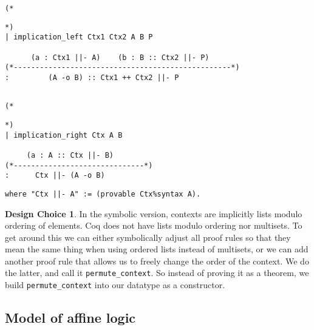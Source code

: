 \documentclass{article}
\theoremstyle{definition}
\newtheorem*{designchoice}{Design Choice}
\begin{document}
\noindent\begin{minipage}{\textwidth}
\begin{verbatim}
(*
\end{verbatim}
\begin{center}\usebox{\lolliL}\end{center}
\begin{verbatim}
*)
| implication_left Ctx1 Ctx2 A B P

      (a : Ctx1 ||- A)    (b : B :: Ctx2 ||- P)
(*--------------------------------------------------*)
:         (A -o B) :: Ctx1 ++ Ctx2 ||- P


\end{verbatim}
\end{minipage}

\noindent\begin{minipage}{\textwidth}
\begin{verbatim}
(*
\end{verbatim}
\begin{center}\usebox{\lolliR}\end{center}
\begin{verbatim}
*)
| implication_right Ctx A B

     (a : A :: Ctx ||- B)
(*------------------------------*)
:      Ctx ||- (A -o B)
\end{verbatim}
\end{minipage}

\begin{verbatim}
where "Ctx ||- A" := (provable Ctx%syntax A).
\end{verbatim}



\begin{designchoice}
In the symbolic version, contexts are implicitly lists modulo ordering of elements. Coq does not have lists modulo ordering nor multisets. To get around this we can either symbolically adjust all proof rules so that they mean the same thing when using ordered lists instead of multisets, or we can add another proof rule that allows us to freely change the order of the context. We do the latter, and call it \verb|permute_context|. So instead of proving it as a theorem, we build \verb|permute_context| into our datatype as a constructor. 
\end{designchoice}

\subsection{Model of affine logic}
\end{document}
